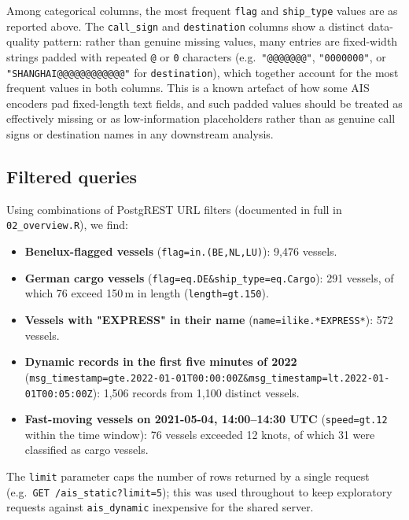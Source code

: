 \documentclass[11pt,a4paper]{article}
\begin{document}
Among categorical columns, the most frequent \texttt{flag} and
\texttt{ship\_type} values are as reported above. The \texttt{call\_sign} and
\texttt{destination} columns show a distinct data-quality pattern: rather
than genuine missing values, many entries are fixed-width strings padded
with repeated \texttt{@} or \texttt{0} characters (e.g.\ \texttt{"@@@@@@@"},
\texttt{"0000000"}, or \texttt{"SHANGHAI@@@@@@@@@@@@"} for
\texttt{destination}), which together account for the most frequent values
in both columns. This is a known artefact of how some AIS encoders pad
fixed-length text fields, and such padded values should be treated as
effectively missing or as low-information placeholders rather than as
genuine call signs or destination names in any downstream analysis.

\subsection{Filtered queries}

Using combinations of PostgREST URL filters (documented in full in
\texttt{02\_overview.R}), we find:

\begin{itemize}[noitemsep]
  \item \textbf{Benelux-flagged vessels} (\texttt{flag=in.(BE,NL,LU)}):
        9{,}476 vessels.
  \item \textbf{German cargo vessels} (\texttt{flag=eq.DE\&ship\_type=eq.Cargo}):
        291 vessels, of which 76 exceed 150\,m in length
        (\texttt{length=gt.150}).
  \item \textbf{Vessels with "EXPRESS" in their name}
        (\texttt{name=ilike.*EXPRESS*}): 572 vessels.
  \item \textbf{Dynamic records in the first five minutes of 2022}
        (\texttt{msg\_timestamp=gte.2022-01-01T00:00:00Z\&msg\_timestamp=lt.2022-01-01T00:05:00Z}):
        1{,}506 records from 1{,}100 distinct vessels.
  \item \textbf{Fast-moving vessels on 2021-05-04, 14:00--14:30 UTC}
        (\texttt{speed=gt.12} within the time window): 76 vessels exceeded
        12 knots, of which 31 were classified as cargo vessels.
\end{itemize}

The \texttt{limit} parameter caps the number of rows returned by a single
request (e.g.\ \texttt{GET /ais\_static?limit=5}); this was used throughout to
keep exploratory requests against \texttt{ais\_dynamic} inexpensive for the
shared server.
\end{document}
